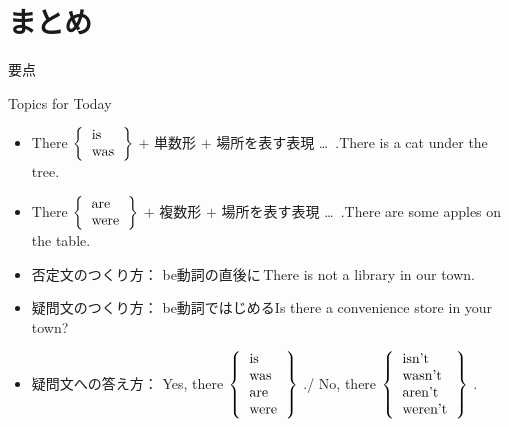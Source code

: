 \documentclass[aspectratio=169,xcolor={dvipsnames,table}]{beamer}
\newcommand{\myaudio}[1]{\href{#1}{\faVolumeUp}}
\begin{document}
\section{まとめ}
\begin{frame}[plain]{要点}

\begin{exampleblock}{Topics for Today}
 \begin{itemize}[square]\small
 \item There $\left\{
              \begin{tabular}{l}
              {is}\\
              {was}
              \end{tabular}
\right\}$ $+$ 単数形 $+$ 場所を表す表現 \ldots\,\,\,.\hfill{\scriptsize There is a cat under the tree.}
 \item There $\left\{
              \begin{tabular}{l}
              {are}\\
              {were}
              \end{tabular}
\right\}$ $+$ 複数形 $+$ 場所を表す表現 \ldots\,\,\,.\hfill{\scriptsize There are some apples on the table.}
 \item 否定文のつくり方： be動詞の直後に\,\hfill{}{\scriptsize There is not a library in our town.}
  \item 疑問文のつくり方： be動詞ではじめる\hfill{}{\scriptsize Is there a convenience store in your town?}
  \item 疑問文への答え方： Yes, there $\left\{
              \begin{tabular}{l}
              is\\
              was\\
              {are}\\
              {were}
              \end{tabular}
\right\}$ .\hfill{}/\hfill
No, there $\left\{
              \begin{tabular}{l}
              isn't\\
              wasn't\\
              {aren't}\\
              {weren't}
              \end{tabular}
\right\}$ .\hfill{}\mbox{}
\end{itemize}
\end{exampleblock}
\hfill\myaudio{./audio/001_there_is_14.mp3}
\end{frame}
\end{document}
